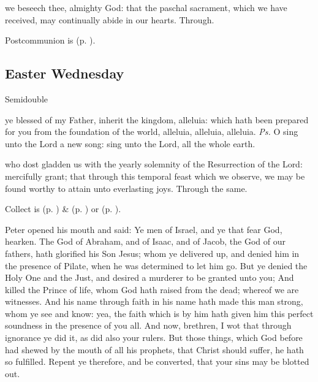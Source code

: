 \postcommunion
{} we beseech thee, almighty God: that the paschal sacrament, which we have received, may continually abide in our hearts. Through.


\begin{rubric}
     Postcommunion is  (p. \pageref{EasterPostcommunion}).
\end{rubric}


\subsection{Easter Wednesday}
\begin{inhead}
    {Semidouble}
\end{inhead}


\introit
{} ye blessed of my Father, inherit the kingdom, alleluia: which hath been prepared for you from the foundation of the world, alleluia, alleluia, alleluia. \textit{Ps.} O sing unto the Lord a new song: sing unto the Lord, all the whole earth.

\collect
{} who dost gladden us with the yearly solemnity of the Resurrection of the Lord: mercifully grant; that through this temporal feast which we observe, we may be found worthy to attain unto everlasting joys. Through the same.
\begin{rubric}
     Collect is  (p. \pageref{EasterCollect}) \&   (p. \pageref{SPAgainst}) or  (p. \pageref{SPChiefBishop}).
\end{rubric}

 Peter opened his mouth and said: Ye men of Israel, and ye that fear God, hearken. The God of Abraham, and of Isaac, and of Jacob, the God of our fathers, hath glorified his Son Jesus; whom ye delivered up, and denied him in the presence of Pilate, when he was determined to let him go. But ye denied the Holy One and the Just, and desired a murderer to be granted unto you; And killed the Prince of life, whom God hath raised from the dead; whereof we are witnesses. And his name through faith in his name hath made this man strong, whom ye see and know: yea, the faith which is by him hath given him this perfect soundness in the presence of you all. And now, brethren, I wot that through ignorance ye did it, as did also your rulers. But those things, which God before had shewed by the mouth of all his prophets, that Christ should suffer, he hath so fulfilled. Repent ye therefore, and be converted, that your sins may be blotted out.

